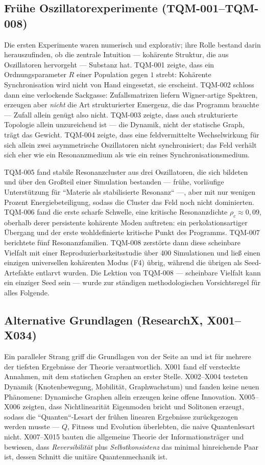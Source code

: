 \documentclass[10pt,twoside,openany]{book}
\begin{document}
\subsection{Frühe Oszillatorexperimente (TQM-001--TQM-008)}

Die ersten Experimente waren numerisch und explorativ; ihre Rolle bestand darin
herauszufinden, ob die zentrale Intuition --- kohärente Struktur, die aus Oszillatoren
hervorgeht --- Substanz hat. TQM-001 zeigte, dass ein Ordnungsparameter $R$ einer
Population gegen $1$ strebt: Kohärente Synchronisation wird nicht von Hand eingesetzt,
sie erscheint. TQM-002 schloss dann eine verlockende Sackgasse: Zufallsmatrizen liefern
Wigner-artige Spektren, erzeugen aber \emph{nicht} die Art strukturierter Emergenz, die
das Programm brauchte --- Zufall allein genügt also nicht. TQM-003 zeigte, dass auch
strukturierte Topologie allein unzureichend ist --- die Dynamik, nicht der statische Graph,
trägt das Gewicht. TQM-004 zeigte, dass eine feldvermittelte Wechselwirkung für sich allein
zwei asymmetrische Oszillatoren nicht synchronisiert; das Feld verhält sich eher wie ein
Resonanzmedium als wie ein reines Synchronisationsmedium.

TQM-005 fand stabile Resonanzcluster aus drei Oszillatoren, die sich bildeten und über den
Großteil einer Simulation bestanden --- frühe, vorläufige Unterstützung für ``Materie als
stabilisierte Resonanz`` ---, aber mit nur wenigen Prozent Energiebeteiligung, sodass die
Cluster das Feld noch nicht dominierten. TQM-006 fand die erste scharfe Schwelle, eine
kritische Resonanzdichte $\rho_c\approx0{,}09$, oberhalb derer persistente kohärente Moden
auftreten: ein perkolationsartiger Übergang und der erste wohldefinierte kritische Punkt
des Programms. TQM-007 berichtete fünf Resonanzfamilien. TQM-008 zerstörte dann diese
scheinbare Vielfalt mit einer Reproduzierbarkeitsstudie über 400 Simulationen und ließ
einen einzigen universellen kohärenten Modus (F4) übrig, während die übrigen als
Seed-Artefakte entlarvt wurden. Die Lektion von TQM-008 --- scheinbare Vielfalt kann ein
einziger Seed sein --- wurde zur ständigen methodologischen Vorsichtsregel für alles
Folgende.

\subsection{Alternative Grundlagen (ResearchX, X001--X034)}

Ein paralleler Strang griff die Grundlagen von der Seite an und ist für mehrere der
tiefsten Ergebnisse der Theorie verantwortlich. X001 fand elf versteckte Annahmen, mit dem
statischen Graphen an erster Stelle. X002--X004 testeten Dynamik (Knotenbewegung,
Mobilität, Graphwachstum) und fanden keine neuen Phänomene: Dynamische Graphen allein
erzeugen keine offene Innovation. X005--X006 zeigten, dass Nichtlinearität Eigenmoden
bricht und Solitonen erzeugt, sodass die ``Quanten``-Lesart der frühen linearen Ergebnisse
zurückgezogen werden musste --- $Q$, Fitness und Evolution überlebten, die naive
Quantenlesart nicht. X007--X015 bauten die allgemeine Theorie der Informationsträger und
bewiesen, dass \emph{Reversibilität} plus \emph{Selbstkonsistenz} das minimal hinreichende
Paar ist, dessen Schnitt die unitäre Quantenmechanik ist.
\end{document}
